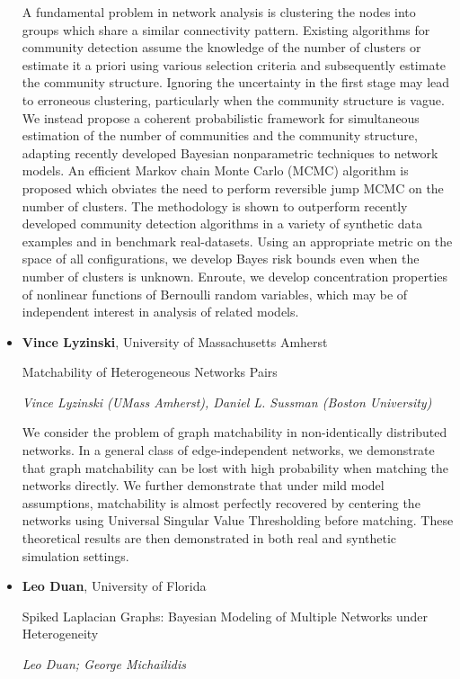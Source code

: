 \begin{itemize}
A fundamental problem in network analysis is clustering the nodes into groups which share a similar connectivity pattern. Existing algorithms for community detection assume the knowledge of the number of clusters or estimate it a priori using various selection criteria and subsequently estimate the community structure. Ignoring the uncertainty in the first stage may lead to erroneous clustering, particularly when the community structure is vague. We instead propose a coherent probabilistic framework for simultaneous estimation of the number of communities and the community structure, adapting recently developed Bayesian nonparametric techniques to network models. An efficient Markov chain Monte Carlo (MCMC) algorithm is proposed which obviates the need to perform reversible jump MCMC on the number of clusters. The methodology is shown to outperform recently developed community detection algorithms in a variety of synthetic data examples and in benchmark real-datasets. Using an appropriate metric on the space of all configurations, we develop Bayes risk bounds even when the number of clusters is unknown.  Enroute, we develop concentration properties of nonlinear functions of Bernoulli random variables, which may be of independent interest in analysis of related models.

\item \textbf{Vince Lyzinski}, University of Massachusetts Amherst

Matchability of Heterogeneous Networks Pairs

\emph{\footnotesize Vince Lyzinski (UMass Amherst), Daniel L. Sussman (Boston University)}

We consider the problem of graph matchability in non-identically distributed networks. In a general class of edge-independent networks, we demonstrate that graph matchability can be lost with high probability when matching the networks directly. We further demonstrate that under mild model assumptions, matchability is almost perfectly recovered by centering the networks using Universal Singular Value Thresholding before matching. These theoretical results are then demonstrated in both real and synthetic simulation settings.

\item \textbf{Leo Duan}, University of Florida

Spiked Laplacian Graphs: Bayesian Modeling of Multiple Networks under Heterogeneity

\emph{\footnotesize Leo Duan; George Michailidis}


\end{itemize}
